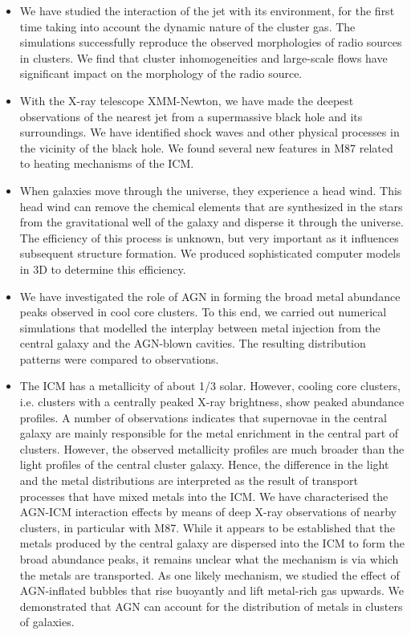 \begin{itemize}

\item We have studied the interaction of the jet with its environment, for the first time taking into account the dynamic nature of the cluster gas.  The simulations successfully reproduce the observed morphologies of radio sources in clusters.  We find that cluster inhomogeneities and large-scale flows have significant impact on the morphology of the radio source.

\item With the X-ray telescope XMM-Newton, we have made the deepest observations of the nearest jet from a supermassive black hole and its surroundings. We have identified shock waves and other physical processes in the vicinity of the black hole. We found several new features in M87 related to heating mechanisms of the ICM.

\item When galaxies move through the universe, they experience a head wind. This head wind  can remove the chemical elements that are synthesized in the stars from the gravitational well of the galaxy and disperse it through the universe. The efficiency of this process is unknown, but very important as it influences subsequent structure formation. We produced sophisticated computer models in 3D to determine this efficiency.

\item We have investigated the role of AGN in forming the broad metal abundance peaks observed in cool core clusters. To this end, we carried out numerical simulations that modelled the interplay between metal injection from the central galaxy and the AGN-blown cavities. The resulting distribution patterns were compared to observations.

\item The ICM has a metallicity of about 1/3 solar. However, cooling core clusters,
i.e. clusters with a centrally peaked X-ray brightness, show peaked abundance
profiles. A number of observations indicates that supernovae in the central galaxy
are mainly responsible for the metal enrichment in the central part of
clusters. However, the observed metallicity profiles are much broader than the
light profiles of the central cluster galaxy. Hence, the difference in the
light and the metal distributions are interpreted as the result of transport
processes that have mixed metals into the ICM. We have characterised the AGN-ICM interaction effects by means of deep X-ray observations of nearby clusters, in particular with M87. While it appears to be established that the metals produced by the central galaxy are dispersed into the ICM to form the
broad abundance peaks, it remains unclear what the mechanism is via which the
metals are transported. As one likely mechanism, we studied the effect of AGN-inflated bubbles that rise buoyantly and lift metal-rich gas upwards. We demonstrated that AGN can account for the distribution of metals in clusters of galaxies.

\end{itemize}

